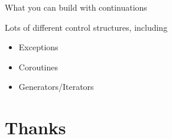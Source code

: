\documentclass[ignorenonframetext,]{beamer}
\begin{document}
\begin{frame}{What you can build with continuations}

Lots of different control structures, including

\begin{itemize}
\itemsep1pt\parskip0pt
\item
  Exceptions
\item
  Coroutines
\item
  Generators/Iterators
\end{itemize}

\end{frame}

\section{Thanks}\label{thanks}
\end{document}
